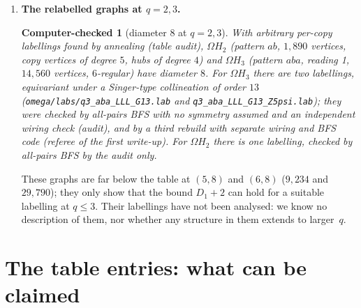 \documentclass[11pt]{amsart}
\newcommand{\file}[1]{\nolinkurl{#1}}
\theoremstyle{plain}
\newtheorem{computer}{Computer-checked}
\theoremstyle{definition}
\theoremstyle{remark}
\newcommand{\Om}{\Omega}
\begin{document}
\begin{enumerate}[leftmargin=1.5em]
\item \textbf{The relabelled graphs at $q = 2, 3$.}
  \begin{computer}[diameter 8 at $q = 2, 3$]\label{cc:q23}
  With arbitrary per-copy labellings found by annealing (table audit), $\Om H_2$ (pattern $ab$, $1{,}890$ vertices,
  copy vertices of degree $5$, hubs of degree $4$) and $\Om H_3$ (pattern $aba$, reading 1, $14{,}560$ vertices,
  $6$-regular) have diameter $8$. For $\Om H_3$ there are two labellings, equivariant under a Singer-type collineation of
  order $13$ (\file{omega/labs/q3_aba_LLL_G13.lab} and \file{q3_aba_LLL_G13_Z5psi.lab}); they were checked by
  all-pairs BFS with no symmetry assumed and an independent wiring check (audit), and by a third rebuild with separate
  wiring and BFS code (referee of the first write-up). For $\Om H_2$ there is one labelling, checked by all-pairs BFS by
  the audit only.
  \end{computer}
  These graphs are far below the table at $(5,8)$ and $(6,8)$ ($9{,}234$ and $29{,}790$); they only show that the bound
  $D_1 + 2$ can hold for a suitable labelling at $q \le 3$. Their labellings have not been analysed: we know no
  description of them, nor whether any structure in them extends to larger~$q$.
\end{enumerate}

\section{The table entries: what can be claimed}\label{sec:claims}
\end{document}
